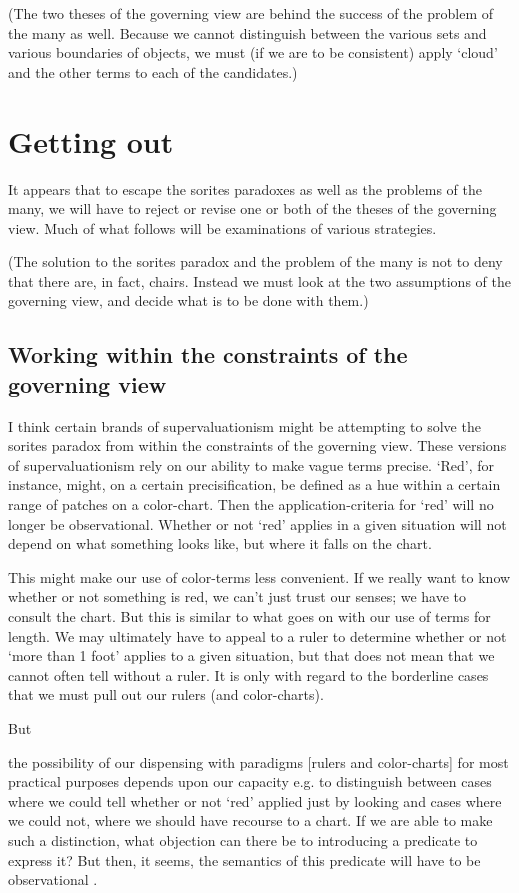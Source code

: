 \documentclass[11pt]{standalone}
\newenvironment{squote}{%
\begin{spacing}{1}
       	\begin{list}{}{%
\setlength{\labelwidth}{0pt}%
\rightmargin\leftmargin%
}
\item\relax
}{%
\end{list}%
\end{spacing}
}
\begin{document}
\begin{spacing}{1.5}
(The two theses of the governing view are behind the success of the
problem of the many as well.  Because we cannot distinguish between
the various sets and various boundaries of objects, we must (if we are
to be consistent) apply `cloud' and the other terms to each of the
candidates.)

\section{Getting out}
It appears that to escape the sorites paradoxes as well as the
problems of the many, we will have to reject or revise one or both of
the theses of the governing view.  Much of what follows will be
examinations of various strategies.

(The solution to the sorites paradox and the problem of the many is
not to deny that there are, in fact, chairs.  Instead we must look at
the two assumptions of the governing view, and decide what is to be
done with them.)

\subsection{Working within the constraints of the governing view}
I think certain brands of supervaluationism might be attempting to
solve the sorites paradox from within the constraints of the governing
view.  These versions of supervaluationism rely on our ability to make
vague terms precise.  `Red', for instance, might, on a certain
precisification, be defined as a hue within a certain range of patches
on a color-chart.  Then the application-criteria for `red' will no
longer be observational.  Whether or not `red' applies in a given
situation will not depend on what something looks like, but where it
falls on the chart.

This might make our use of color-terms less convenient.  If we really
want to know whether or not something is red, we can't just trust our
senses; we have to consult the chart.  But this is similar to what
goes on with our use of terms for length.  We may ultimately have to
appeal to a ruler to determine whether or not `more than 1 foot'
applies to a given situation, but that does not mean that we cannot
often tell without a ruler.  It is only with regard to the borderline
cases that we must pull out our rulers (and color-charts).

But

\begin{squote}
the possibility of our dispensing with paradigms [rulers and
  color-charts] for most practical purposes depends upon our capacity
e.g. to distinguish between cases where we could tell whether or not
`red' applied just by looking and cases where we could not, where we
should have recourse to a chart.  If we are able to make such a
distinction, what objection can there be to introducing a predicate to
express it?  But then, it seems, the semantics of this predicate will
have to be observational \citep[359]{wright1975}.
\end{squote}


\end{spacing}
\end{document}
